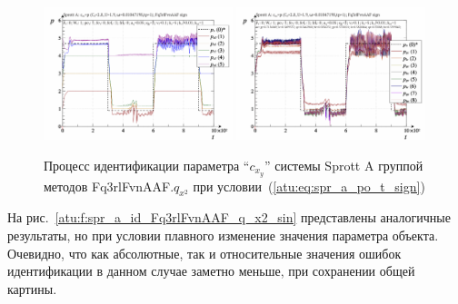 \begin{figure}[htb!]
  \centerline{
    \includegraphics[width=0.49\textwidth]{p/cha/spr_a/Fq3rlFvnAAF_x2/sprott_a_id-p_t_pi_Fq3rlFvnAAF_sign.png}
    \hfill
    \includegraphics[width=0.49\textwidth]{p/cha/spr_a/Fq3rlFvnAAF_x2/sprott_a_id-p_t_p_Fq3rlFvnAAF_sign.png}
  }
  \caption{Процесс идентификации параметра ``$c_{x_y}$'' системы Sprott A группой методов Fq3rlFvnAAF.$q_{x^2}$ при условии~(\ref{atu:eq:spr_a_po_t_sign})}
  \label{atu:f:spr_a_id_Fq3rlFvnAAF_q_x2_sign}
\end{figure}

На рис.~\ref{atu:f:spr_a_id_Fq3rlFvnAAF_q_x2_sin} представлены аналогичные результаты,
но при условии плавного изменение значения параметра объекта. Очевидно, что
как абсолютные, так и относительные значения ошибок идентификации в данном случае заметно
меньше, при сохранении общей картины.

